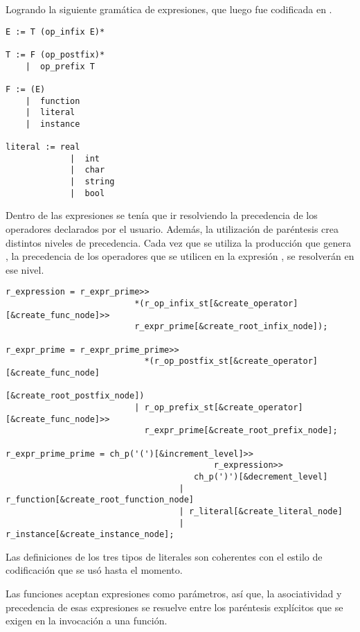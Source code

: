Logrando la siguiente gramática de expresiones, que luego fue codificada en \spirit.

\begin{lstlisting}[basicstyle=\normalsize, backgroundcolor=\color{white}, columns=fullflexible, linewidth=7cm]
E := T (op_infix E)*

T := F (op_postfix)*
    |  op_prefix T

F := (E)
    |  function
    |  literal
    |  instance

literal := real
             |  int
             |  char
             |  string
             |  bool
\end{lstlisting}

Dentro de las expresiones se tenía que ir resolviendo la precedencia de los operadores declarados por el usuario. Además, la utilización de paréntesis crea distintos niveles de precedencia. Cada vez que se utiliza la producción que genera , la precedencia de los operadores que se utilicen en la expresión , se resolverán en ese nivel.

\begin{lstlisting}[columns=fullflexible, linewidth=13.5cm]
r_expression = r_expr_prime>>
                          *(r_op_infix_st[&create_operator][&create_func_node]>>
                          r_expr_prime[&create_root_infix_node]);

r_expr_prime = r_expr_prime_prime>>
                            *(r_op_postfix_st[&create_operator][&create_func_node]
                                                    [&create_root_postfix_node])
                          | r_op_prefix_st[&create_operator][&create_func_node]>>
                            r_expr_prime[&create_root_prefix_node];

r_expr_prime_prime = ch_p('(')[&increment_level]>>
                                          r_expression>>
                                      ch_p(')')[&decrement_level]
                                   | r_function[&create_root_function_node]
                                   | r_literal[&create_literal_node]
                                   | r_instance[&create_instance_node];
\end{lstlisting}

Las definiciones de los tres tipos de literales son coherentes con el estilo de codificación que se usó hasta el momento.

Las funciones aceptan expresiones como parámetros, así que, la asociatividad y precedencia de esas expresiones se resuelve entre los paréntesis explícitos que se exigen en la invocación a una función.

